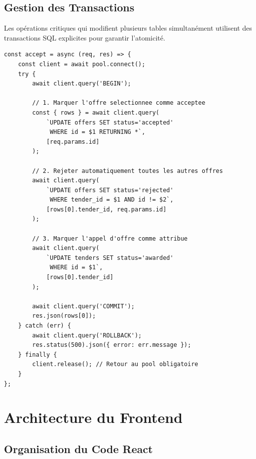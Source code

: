 \documentclass[12pt,a4paper]{report}
\begin{document}
\section{Gestion des Transactions}

Les opérations critiques qui modifient plusieurs tables simultanément utilisent des transactions SQL explicites pour garantir l'atomicité.

\begin{lstlisting}[style=js, caption={Transaction — Acceptation d'une offre (offerController.js)}]
const accept = async (req, res) => {
    const client = await pool.connect();
    try {
        await client.query('BEGIN');

        // 1. Marquer l'offre selectionnee comme acceptee
        const { rows } = await client.query(
            `UPDATE offers SET status='accepted'
             WHERE id = $1 RETURNING *`,
            [req.params.id]
        );

        // 2. Rejeter automatiquement toutes les autres offres
        await client.query(
            `UPDATE offers SET status='rejected'
             WHERE tender_id = $1 AND id != $2`,
            [rows[0].tender_id, req.params.id]
        );

        // 3. Marquer l'appel d'offre comme attribue
        await client.query(
            `UPDATE tenders SET status='awarded'
             WHERE id = $1`,
            [rows[0].tender_id]
        );

        await client.query('COMMIT');
        res.json(rows[0]);
    } catch (err) {
        await client.query('ROLLBACK');
        res.status(500).json({ error: err.message });
    } finally {
        client.release(); // Retour au pool obligatoire
    }
};
\end{lstlisting}

\chapter{Architecture du Frontend}

\section{Organisation du Code React}
\end{document}

